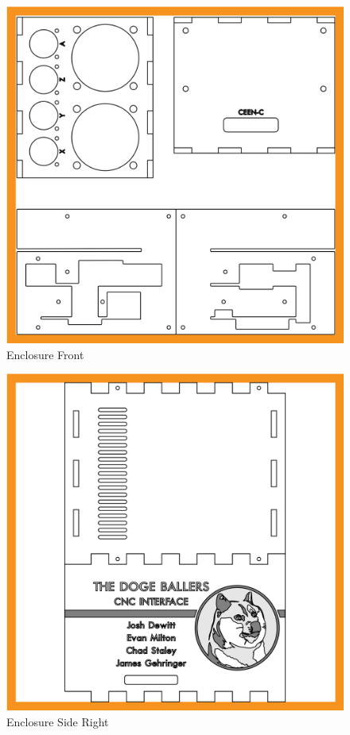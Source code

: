 \begin{figure}[h]
	\centering
	\includegraphics[width=1\textwidth]{packaging-design/front.png}
	\caption{Enclosure Front}
	\label{fig:front}
\end{figure}

\begin{figure}[h]
	\centering
	\includegraphics[width=1\textwidth]{packaging-design/side1.png}
	\caption{Enclosure Side Right}
	\label{fig:side1}
\end{figure}

